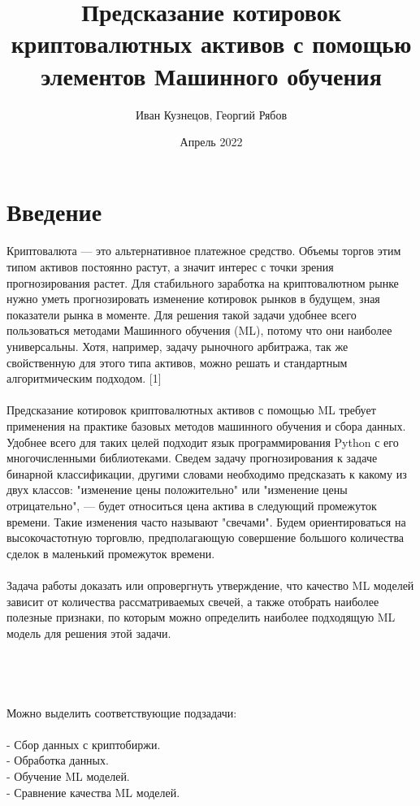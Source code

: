 \documentclass{article}
\title{Предсказание котировок криптовалютных активов с помощью элементов Машинного обучения }
\author{Иван Кузнецов, Георгий Рябов}
\date{Апрель 2022}
\begin{document}
	\maketitle
	
	\section{Введение}
	\paragraph{}
	Криптовалюта — это альтернативное платежное средство. Объемы торгов этим типом активов постоянно растут, а значит интерес с точки зрения прогнозирования растет. Для  стабильного заработка на криптовалютном рынке нужно уметь прогнозировать изменение котировок рынков в будущем, зная показатели рынка в моменте. Для решения такой задачи удобнее всего пользоваться методами Машинного обучения (ML), потому что они наиболее универсальны. Хотя, например, задачу рыночного арбитража, так же свойственную  для этого типа активов, можно решать и стандартным алгоритмическим подходом. [1]
	\paragraph{}
	Предсказание котировок криптовалютных активов с помощью ML требует применения на практике базовых методов машинного обучения и сбора данных. Удобнее всего для таких целей подходит язык программирования Python с его многочисленными библиотеками. Сведем задачу прогнозирования к задаче бинарной классификации, другими словами необходимо предсказать к какому из двух классов: "изменение цены положительно" или "изменение цены отрицательно", — будет относиться цена актива в следующий промежуток времени. Такие изменения часто называют "свечами". Будем ориентироваться на высокочастотную торговлю, предполагающую совершение большого количества сделок в маленький промежуток времени.
	\paragraph{}
	Задача работы доказать или опровергнуть утверждение, что качество ML моделей зависит от количества рассматриваемых свечей, а также отобрать наиболее полезные признаки, по которым можно определить наиболее подходящую ML модель для решения этой задачи.
	\\
	\\
	\\
	\\
	\\Можно выделить соответствующие подзадачи:
	\\
	\\
	- Сбор данных с криптобиржи.\\
	- Обработка данных.\\
	- Обучение ML моделей. \\
	- Сравнение качества ML моделей.
\end{document}

